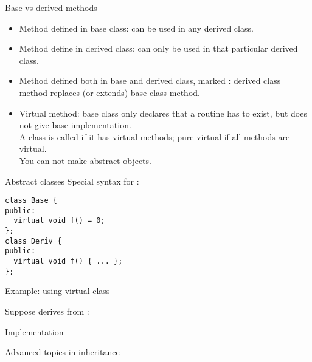 \begin{block}{Base vs derived methods}
  \begin{itemize}
  \item Method defined in base class: can be used in any derived class.
  \item Method define in derived class: can only be used in that
    particular derived class.
  \item Method defined both in base and derived class, marked
    : derived class method replaces (or extends)
    base class method.
  \item Virtual method: base class only declares that a routine has to
    exist, but does not give base implementation.\\ A class is called
     if it has virtual methods; pure
    virtual if all methods are virtual.\\ You can not make abstract objects.
  \end{itemize}  
\end{block}

\begin{block}{Abstract classes}
  Special syntax for :
\begin{verbatim}
class Base {
public:
  virtual void f() = 0;
};
class Deriv {
public:
  virtual void f() { ... };
};
\end{verbatim}
\end{block}

\begin{block}{Example: using virtual class}
  \small
  \begin{multicols}{2}
    \vfill\columnbreak
    Suppose  derives from :\\
  \end{multicols}
\end{block}

\begin{block}{Implementation}
  \footnotesize
  \begin{multicols}{2}
    \vfill\columnbreak
  \end{multicols}
\end{block}

 {Advanced topics in inheritance}


